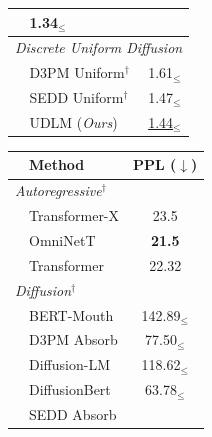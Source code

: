 \documentclass{article} %
\begin{document}
\begin{figure}
\begin{minipage}[t]{0.49\linewidth}
\begin{tabular}{llc}
    & 1.34$_\leq$ \\
    \midrule
    \multicolumn{3}{l}{\textit{Discrete Uniform Diffusion}} \\
    & D3PM Uniform$^\dagger$ 
    \scriptsize{\citep{austin2021structured}}
    & 1.61$_\leq$ \\
    & SEDD Uniform$^\dagger$ 
    \scriptsize{\citep{lou2023discrete}}
    & 1.47$_\leq$ \\
    & UDLM (\textit{Ours}) & \underline{1.44}$_\leq$\\
    \bottomrule
\end{tabular}
\end{minipage}
\hfill
\begin{minipage}[t]{0.46\linewidth}
\centering
\small
{}
\label{tab:lm1b}
\begin{tabular}{llc}
    \toprule
    & Method & PPL ($\downarrow$) \\
    \midrule
    \multicolumn{3}{l}{\textit{Autoregressive}$^\dagger$} \\
    & Transformer-X
    \scriptsize{\citep{dai2019transformer}}
    & 23.5 \\
    & OmniNetT 
    \scriptsize{\citep{tay2021omninet}}
    & \bf{21.5} \\
    & Transformer & 22.32 \\
    \multicolumn{3}{l}{\textit{Diffusion}$^\dagger$} \\
    & BERT-Mouth 
    \scriptsize{\citep{wang2019bert}}
    & 142.89$_\leq$ \\
    & D3PM Absorb 
    \scriptsize{\citep{austin2021structured}}
    & 77.50$_\leq$ \\
    & Diffusion-LM 
    \scriptsize{\citep{li2022diffusion}}
    & 118.62$_\leq$ \\
    & DiffusionBert 
    \scriptsize{\citep{wang2019bert}}
    & 63.78$_\leq$ \\
    & SEDD Absorb 
    \scriptsize{\citep{lou2023discrete}}

\end{tabular}
\end{minipage}
\end{figure}
\end{document}
